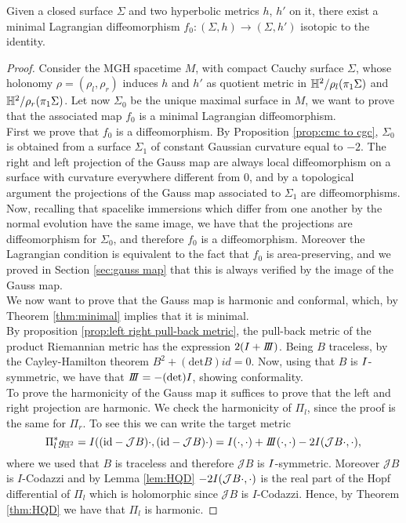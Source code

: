 \begin{theorem}
    Given a closed surface $\Sigma$ and two hyperbolic metrics $h$, $h'$ on it, there exist a minimal Lagrangian diffeomorphism $f_0 : (\Sigma,h) \to (\Sigma,h')$ isotopic to the identity.
\end{theorem}
\begin{proof}
    Consider the MGH spacetime $M$, with compact Cauchy surface $\Sigma$, whose holonomy $\rho = (\rho_l, \rho_r)$ induces $h$ and $h'$ as quotient metric in $\mathbb{H}^2 / \rho_l(\pi_1 \Sigma)$ and $\mathbb{H}^2 / \rho_r(\pi_1 \Sigma)$. Let now $\Sigma_0$ be the unique maximal surface in $M$, we want to prove that the associated map $f_0$ is a minimal Lagrangian diffeomorphism.\\
    First we prove that $f_0$ is a diffeomorphism. By Proposition \ref{prop:cmc to cgc}, $\Sigma_0$ is obtained from a surface $\Sigma_1$ of constant Gaussian curvature equal to $-2$. The right and left projection of the Gauss map are always local diffeomorphism on a surface with curvature everywhere different from $0$, and by a topological argument the projections of the Gauss map associated to $\Sigma_1$ are diffeomorphisms. Now, recalling that spacelike immersions which differ from one another by the normal evolution have the same image, we have that the projections are diffeomorphism for $\Sigma_0$, and therefore $f_0$ is a diffeomorphism. Moreover the Lagrangian condition is equivalent to the fact that $f_0$ is area-preserving, and we proved in Section \ref{sec:gauss map} that this is always verified by the image of the Gauss map.\\
    We now want to prove that the Gauss map is harmonic and conformal, which, by Theorem \ref{thm:minimal} implies that it is minimal.\\
    By proposition \ref{prop:left right pull-back metric}, the pull-back metric of the product Riemannian metric has the expression $2(\I + \III)$. Being $B$ traceless, by the Cayley-Hamilton theorem $B^2 + (\text{det}B)id = 0$. Now, using that $B$ is $I$-symmetric, we have that $\III = -(\text{det})I$, showing conformality.\\
    To prove the harmonicity of the Gauss map it suffices to prove that the left and right projection are harmonic. We check the harmonicity of $\Pi_l$, since the proof is the same for $\Pi_r$. To see this we can write the target metric
    \[
        \Pi_l^*g_{\H^2}=I((\text{id}-\mathcal{J}B)\cdot,(\text{id}-\mathcal{J}B)\cdot) = \I(\cdot, \cdot) + \III(\cdot, \cdot) - 2\I(\mathcal{J}B \cdot, \cdot),
    \]
    where we used that $B$ is traceless and therefore $\mathcal{J}B$ is $I$-symmetric. Moreover $\mathcal{J} B$ is $I$-Codazzi and by Lemma \ref{lem:HQD} $- 2I(\mathcal{J}B \cdot, \cdot)$ is the real part of the Hopf differential of $\Pi_l$ which is holomorphic since $\mathcal{J}B$ is $I$-Codazzi. Hence, by Theorem \ref{thm:HQD} we have that $\Pi_l$ is harmonic.
\end{proof}
